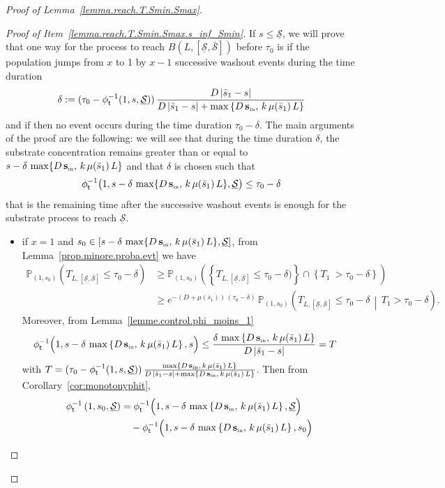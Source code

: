\documentclass[AHL,Unicode,longabstracts,published]{cedram}
\newcommand{\PP}{\mathbb{P}}
\newcommand{\Sin}{{\mathbf s}_{\textrm{\tiny\rm in}}}
\newcommand{\Smin}{\underline{\mathcal{S}}}
\newcommand{\Smax}{\bar{\mathcal{S}}}
\newcommand{\barmu}{\mu(\bar s_1)}
\newcommand{\phit}{\phi_\textsf{t}^{-1}}
\newcommand{\1}{\mathbf{1}}
\begin{document}
\begin{proof}[Proof of Lemma~\ref{lemma.reach.T.Smin.Smax}]\leavevmode
\begin{proof}[{Proof of Item~\eqref{lemma.reach.T.Smin.Smax.s_inf_Smin}}]
If $s \leq \Smin$, we will prove that one way for the process to reach $B(L,[\Smin,\Smax])$ before $\tau_0$ is if the population jumps from $x$ to 1 by $x-1$ successive washout events during the time duration
\[
\delta:=(\tau_0-\phit(1, s,\Smin))\,\frac{D\,|\bar s_1-s|}{D\,|\bar s_1-s|+\max\left\{D\,\Sin,\,k\,\barmu\,L\right\}}
\]
and if then no event occurs during the time duration $\tau_0-\delta$. The main arguments of the proof are the following: we will see that during the time duration $\delta$, the substrate concentration remains greater than or equal to $s-\delta\,\max\{D\,\Sin,\,k\,\barmu\,L\}$ and that $\delta$ is chosen such that
\[
\phit\big(1, s-\delta\,\max\{D\,\Sin,\,k\,\barmu\,L\},\Smin\big)\leq \tau_0-\delta
\]
that is the remaining time after the successive washout events is enough for the substrate process to reach $\Smin$.
\begin{itemize}
\item if $x=1$ and $s_0 \in [s-\delta\,\max\{D\,\Sin,\,k\,\barmu\,L\}, \Smin]$, from Lemma~\ref{prop.minore.proba.evt} we have
\begin{align*}
\PP_{(1,s_0)}\left(T_{L,[\Smin,\Smax]}\leq \tau_0-\delta\right) & \geq
\PP_{(1,s_0)}\left(\left\{T_{L,[\Smin,\Smax]}\leq \tau_0-\delta)\right\}
\cap \left\{T_1\ > \tau_0-\delta\right\}\right)
\\
&\geq e^{-(D+\barmu)\, (\tau_0-\delta)}\,
\PP_{(1,s_0)}
\left(T_{L,\left[\Smin,\Smax\right]}\leq \tau_0-\delta \, \middle| \, T_1> \tau_0-\delta\right).
\end{align*}
Moreover, from Lemma~\ref{lemme.control.phi_moins_1}
\begin{align*}
\phit \Big(1,s-\delta\,\max\left\{D\,\Sin,\,k\,\barmu\,L\right\},s\Big) &\leq \frac{\delta\,\max\left\{D\,\Sin,\,k\,\barmu\,L\right\}}{D\,|\bar s_1-s|} =T
\end{align*}
with $T=(\tau_0-\phit(1, s,\Smin))\,\frac{\max\{D\,\Sin,\,k\,\barmu\,L\}}{D\,|\bar s_1-s|+\max\{D\,\Sin,\,k\,\barmu\,L\}}$. Then from Corollary~\ref{cor:monotonyphit},
\begin{align*}
\phit\left(1, s_0,\Smin \right) &= \phit \Big(1,s-\delta\,\max\left\{D\,\Sin,\,k\,\barmu\,L\right\},\Smin\Big)
\\ &\quad- \phit \Big(1,s-\delta\,\max\left\{D\,\Sin,\,k\,\barmu\,L\right\},s_0\Big)
\\

\end{align*}
\end{itemize}
\end{proof}
\end{proof}
\end{document}
